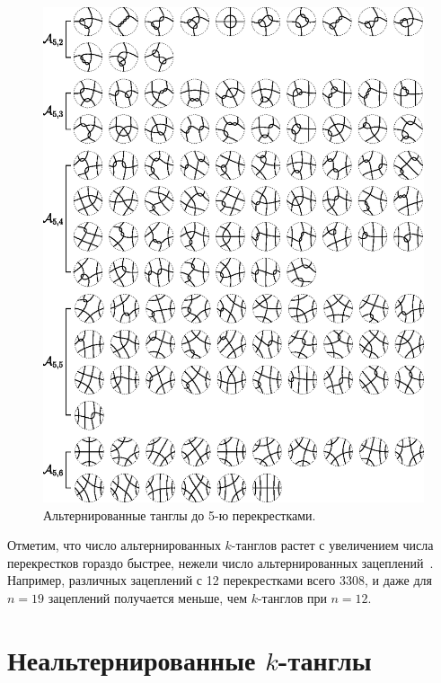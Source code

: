 \documentclass[12pt]{article}
\theoremstyle{plain}
\theoremstyle{definition}
\begin{document}
		\begin{figure}[ht]
			\centering
			\includegraphics[scale=0.8]{c/alternating-tangles-5.eps}
			\caption{\footnotesize Альтернированные танглы до 5-ю перекрестками.\label{figure:tangles5}}
		\end{figure}

		Отметим, что число альтернированных $k$-танглов растет с увеличением числа перекрестков гораздо быстрее, нежели число
		альтернированных зацеплений~\cite{RankinSchermannSmith2002_1, RankinSchermannSmith2002_2, RankinSmith2002}. Например, различных
		зацеплений с 12 перекрестками всего 3308, и даже для $n = 19$ зацеплений получается меньше, чем $k$-танглов при $n = 12$.

	\newpage
	\section{Неальтернированные $k$-танглы}\label{section:non-alternating}
\end{document}
